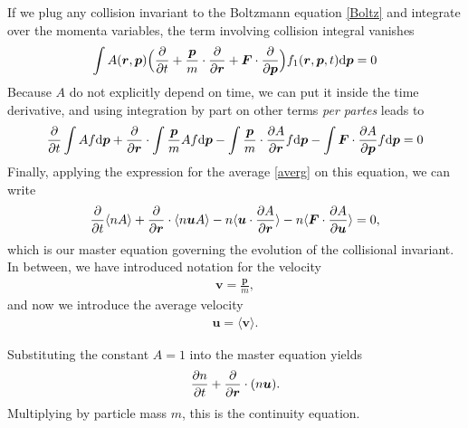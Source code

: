 If we plug any collision invariant to the Boltzmann equation \ref{Boltz} and integrate over the momenta variables, the term involving collision integral vanishes
\begin{align*}
\int A(\bm{r},\bm{p}) \Big( \frac{\partial }{\partial t} + \frac{\bm{p}}{m}\cdot \frac{\partial}{\partial \bm{r}} + \bm{F} \cdot \frac{\partial}{\partial \bm{p}} \Big) f_1(\bm{r},\bm{p},t) \mathrm{d} \bm{p} = 0
\end{align*} 
Because $A$ do not explicitly depend on time, we can put it inside the time derivative, and using integration by part on other terms \textit{per partes} leads to
\begin{align*}
\frac{\partial}{\partial t} \int A f \mathrm{d}\bm{p} + \frac{\partial}{\partial \bm{r}} \cdot \int \frac{\bm{p}}{m} A f \mathrm{d} \bm{p} - \int \frac{\bm{p}}{m} \cdot \frac{\partial A}{\partial \bm{r}} f \mathrm{d} \bm{p} - \int \bm{F} \cdot \frac{\partial A}{\partial \bm{p}}f \mathrm{d} \bm{p} = 0
\end{align*}
Finally, applying the expression for the average \ref{averg} on this equation, we can write
\begin{align} \label{master}
\frac{\partial}{\partial t} \langle n A \rangle + \frac{\partial}{\partial \bm{r}} \cdot \langle n \bm{u} A \rangle - n \langle\bm{u} \cdot \frac{\partial A}{\partial \bm{r}} \rangle - n \langle \bm{F} \cdot \frac{\partial A}{\partial \bm{u}} \rangle = 0,
\end{align}
which is our master equation governing the evolution of the collisional invariant.
In between, we have introduced notation for the velocity
\begin{align*}
\bm{v} = \frac{\bm{p}}{m},
\end{align*}
and now we introduce the average velocity
\begin{align*}
\bm{u} = \langle \bm{v} \rangle.
\end{align*}


Substituting the constant $A=1$ into the master equation yields
\begin{align*}
\frac{\partial n}{\partial t} + \frac{\partial}{\partial \bm{r}} \cdot (n \bm{u}). 
\end{align*}
Multiplying by particle mass $m$, this is the continuity equation.

